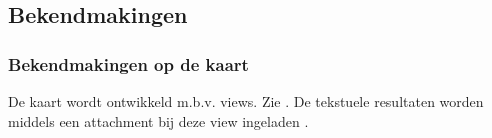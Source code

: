 \subsection{Bekendmakingen}\label{bekendmakingen}

\subsubsection{Bekendmakingen op de kaart}\label{bekendmakingen-op-de-kaart}

De kaart wordt ontwikkeld m.b.v. views. Zie . De tekstuele resultaten worden middels een attachment bij deze view ingeladen .
